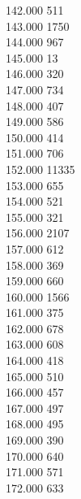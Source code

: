 { 142.000	511 \\
 143.000	1750 \\
 144.000	967 \\
 145.000	13 \\
 146.000	320 \\
 147.000	734 \\
 148.000	407 \\
 149.000	586 \\
 150.000	414 \\
 151.000	706 \\
 152.000	11335 \\
 153.000	655 \\
 154.000	521 \\
 155.000	321 \\
 156.000	2107 \\
 157.000	612 \\
 158.000	369 \\
 159.000	660 \\
 160.000	1566 \\
 161.000	375 \\
 162.000	678 \\
 163.000	608 \\
 164.000	418 \\
 165.000	510 \\
 166.000	457 \\
 167.000	497 \\
 168.000	495 \\
 169.000	390 \\
 170.000	640 \\
 171.000	571 \\
 172.000	633 \\
}
